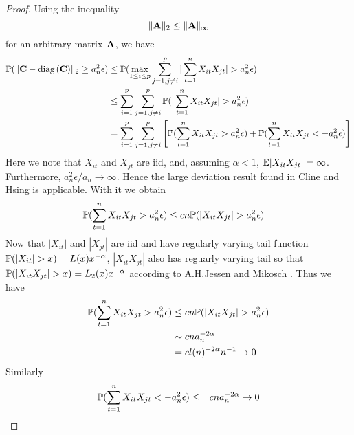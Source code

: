 \documentclass{article}
\begin{document}
\begin{proof}
  Using the inequality
  \[
  \|\mathbf{A}\|_2 \leq \|\mathbf{A}\|_\infty
  \]
  for an arbitrary matrix $\mathbf{A}$, we have
  \begin{align*}
    \mathbb{P}(\|\mathbf{C} - \text{diag\,}(\mathbf{C})\|_2 \geq a_n^2 \epsilon) & \leq
    \mathbb{P}(\max_{1\leq i \leq p} \sum_{j=1, j\neq i}^p |\sum_{t=1}^n
    X_{it} X_{jt}| > a_n^2 \epsilon) \\
    &\leq \sum_{i=1}^p \sum_{j=1, j\neq i}^p \mathbb{P}(|\sum_{t=1}^n
    X_{it} X_{jt}| > a_n^2 \epsilon) \\
    &= \sum_{i=1}^p \sum_{j=1, j\neq i}^p \left[\mathbb{P}(\sum_{t=1}^n
      X_{it} X_{jt} > a_n^2 \epsilon) + \mathbb{P}(\sum_{t=1}^n
      X_{it} X_{jt} < -a_n^2 \epsilon) \right]\\
  \end{align*}
  Here we note that $X_{it}$ and $X_{jt}$ are iid, and, assuming $\alpha
  < 1$, $\mathbb{E} |X_{it} X_{jt}| = \infty$. Furthermore, $a_n^2 \epsilon /
  a_n \to \infty$. Hence the large deviation result found in 
  Cline and Hsing \cite{ClingHsing1998} is applicable. With it we
  obtain
  \begin{align*}
    \mathbb{P}(\sum_{t=1}^n X_{it} X_{jt} > a_n^2 \epsilon) &\leq
    c n \mathbb{P}(|X_{it} X_{jt}| > a_n^2 \epsilon)
  \end{align*}
  Now that $|X_{it}|$ and $|X_{jt}|$ are iid and have regularly
  varying tail function $\mathbb{P}(|X_{it}| > x) = L(x)x^{-\alpha}$,
  $|X_{it} X_{jt}|$ also has reguarly varying tail so that
  $\mathbb{P}(|X_{it} X_{jt}| > x) = L_2(x) x^{-\alpha}$ according to
  A.H.Jessen and Mikosch \cite{JessenMikosch2006}. Thus we have
  \begin{align*}
    \mathbb{P}(\sum_{t=1}^n X_{it} X_{jt} > a_n^2 \epsilon) &\leq
    c n \mathbb{P}(|X_{it} X_{jt}| > a_n^2 \epsilon) \\
    &\sim c n a_n^{-2\alpha} \\
    &= c l(n)^{-2\alpha} n^{-1} \to 0
  \end{align*}
  Similarly
  \begin{eqnarray*}
    \mathbb{P}(\sum_{t=1}^n X_{it} X_{jt} < -a_n^2 \epsilon) &\leq& c n
    a_n^{-2\alpha} \to 0
  \end{eqnarray*}
\end{proof}
\end{document}

